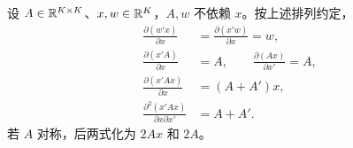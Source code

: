 \begin{theorem}[线性与二次型求导]\label{reg:entry:33}
设 $A\in\mathbb{R}^{K\times K}$、$x,w\in\mathbb{R}^K$，$A,w$ 不依赖 $x$。按上述排列约定，
\begin{align*}
\frac{\partial(w'x)}{\partial x}&=\frac{\partial(x'w)}{\partial x}=w,\\
\frac{\partial(x'A)}{\partial x}&=A,\qquad \frac{\partial(Ax)}{\partial x'}=A,\\
\frac{\partial(x'Ax)}{\partial x}&=(A+A')x,\\
\frac{\partial^2(x'Ax)}{\partial x\partial x'}&=A+A'.
\end{align*}
若 $A$ 对称，后两式化为 $2Ax$ 和 $2A$。
\end{theorem}

